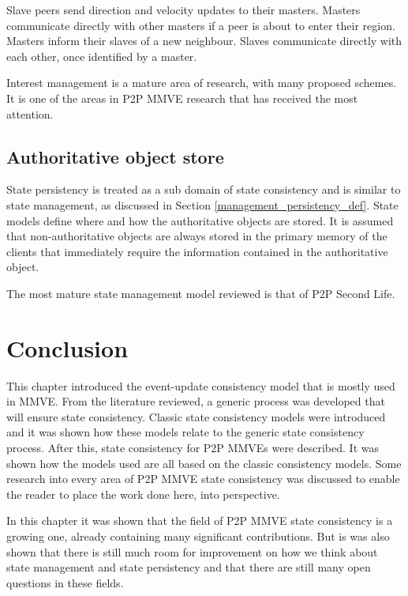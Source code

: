 Slave peers send direction and velocity updates to their masters. Masters communicate directly with other masters if a peer is about to enter their region. Masters inform their slaves of a new neighbour. Slaves communicate directly with each other, once identified by a master.

Interest management is a mature area of research, with many proposed schemes. It is one of the areas in P2P MMVE research that has received the most attention.

\subsection{Authoritative object store}

State persistency is treated as a sub domain of state consistency and is similar to state management, as discussed in Section \ref{management_persistency_def}. State models define where and how the authoritative objects are stored. It is assumed that non-authoritative objects are always stored in the primary memory of the clients that immediately require the information contained in the authoritative object.

The most mature state management model reviewed is that of P2P Second Life.

\section{Conclusion}

This chapter introduced the event-update consistency model that is mostly used in MMVE. From the literature reviewed, a generic process was developed that will ensure state consistency. Classic state consistency models were introduced and it was shown how these models relate to the generic state consistency process. After this, state consistency for P2P MMVEs were described. It was shown how the models used are all based on the classic consistency models. Some research into every area of P2P MMVE state consistency was discussed to enable the reader to place the work done here, into perspective.

In this chapter it was shown that the field of P2P MMVE state consistency is a growing one, already containing many significant contributions. But is was also shown that there is still much room for improvement on how we think about state management and state persistency and that there are still many open questions in these fields.
